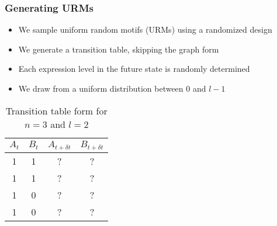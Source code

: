 \documentclass[hyperref={pdfpagelabels=false}]{beamer}
\begin{document}
\begin{frame}
\frametitle{Generating URMs}
\begin{itemize}
\item We sample uniform random motifs (URMs) using a randomized design
\item We generate a transition table, skipping the graph form
\item Each expression level in the future state is randomly determined
\item We draw from a uniform distribution between $0$ and $l-1$
\end{itemize}
\begin{table}[ht]
\begin{center}
\begin{tabular}{|c|c||c|c|}
\hline
$A_t$ & $B_t$ & $A_{t+\delta t}$ & $B_{t+\delta t}$ \\
\hline
\hline
1 & 1 & ? & ? \\
1 & 1 & ? & ? \\
1 & 0 & ? & ? \\
1 & 0 & ? & ? \\
\hline
\end{tabular}
\end{center}
\caption{Transition table form for $n=3$ and $l=2$}
\end{table}
\end{frame}
\end{document}
